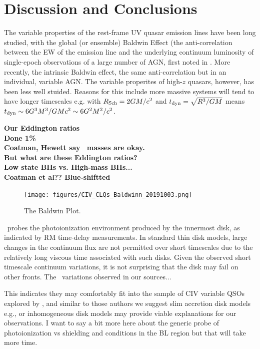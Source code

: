 \documentclass[a4paper,fleqn,usenatbib]{mnras}
\begin{document}
\section{Discussion and Conclusions}
The variable properties of the rest-frame UV quasar emission lines
have been long studied, with the global (or ensemble) Baldwin Effect
(the anti-correlation between the EW of the emission line and the
underlying continuum luminosity of single-epoch observations of a
large number of AGN, first noted in \citet{Baldwin1977}. 
More recently, the intrinsic Baldwin effect, the same anti-correlation but in an individual, variable AGN.
%
The variable properites of high-$z$ quasars, however, has been less 
well stuided. Reasons for this include more massive systems will tend to 
have longer timescales e.g. with $R_{\rm Sch}= 2GM /c^{2}$ and $t_{\rm dyn} =\sqrt{ R^{3}/GM}$
means   $t_{\rm dyn} \sim 6G^{3} M^{3} / GM c^{2} \sim 6G^{2} M^{2} / c^{2} $.

\noindent
{\bf Our Eddington ratios \\
Done 1\% \\
Coatman, Hewett say \civ\ masses are okay.\\
But what are these Eddington ratios? \\
Low state BHs vs. High-mass BHs... \\
Coatman et al?? Blue-shiftted \\
}

\begin{figure}
  \centering
  \texttt{[image: figures/CIV\_CLQs\_Baldwinn\_20191003.png]}
   \vspace{-12pt}
  \caption[]{The Baldwin Plot.}
  \label{fig:REWvsFWHM}
\end{figure}

\civ\ probes the photoionization environment produced by the innermost
disk, as indicated by RM time-delay measurements. In standard \citet{SS73}
thin disk models, large changes in the continuum flux are not
permitted over short timescales due to the relatively long viscous
time associated with such disks. Given the observed short timescale
continuum variations, it is not surprising that the \citet{SS73} disk may fail
on other fronts. The \civ\ variations observed in our sources... 

This indicates they may comfortably fit into the sample of CIV
variable QSOs explored by \citet{Dyer2019}, and similar to those
authors we suggest slim accretion disk models e.g., 
\citet[][]{Abramowicz1988} or inhomogeneous disk models
\citep[e.g.,][]{DexterAgol2011} may provide viable explanations for
our observations. I want to say a bit more here about the generic
probe of photoionization vs shielding and conditions in the BL region
but that will take more time.
\end{document}
